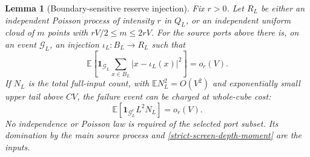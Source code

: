 \documentclass[11pt,reqno]{amsart}
\newtheorem{lemma}[theorem]{Lemma}
\theoremstyle{definition}
\theoremstyle{remark}
\numberwithin{equation}{section}
\newcommand{\E}{\mathbb E}
\begin{document}
\begin{lemma}[Boundary-sensitive reserve injection]
\label{strict-screen-injection}
Fix \(r>0\). Let \(R_L\) be either an independent Poisson process of
intensity \(r\) in \(Q_L\), or an independent uniform cloud of \(m\)
points with \(rV/2\le m\le2rV\). For the source ports above there is,
on an event \(\mathcal G_L\), an injection \(\iota_L:B_L\to R_L\)
such that
\begin{equation}
\label{strict-screen-injection-cost}
 \E\!\left[\mathbf1_{\mathcal G_L}
        \sum_{x\in B_L}|x-\iota_L(x)|^2\right]=o_r(V).
\end{equation}
If \(N_L\) is the total full-input count, with
\(\E N_L^2=O(V^2)\) and exponentially small upper tail above \(CV\),
the failure event can be charged at whole-cube cost:
\begin{equation}
\label{strict-screen-injection-exception}
 \E\!\left[\mathbf1_{\mathcal G_L^c}L^2N_L\right]=o_r(V).
\end{equation}
No independence or Poisson law is required of the selected port subset.
Its domination by the main source process and
\eqref{strict-screen-depth-moment} are the inputs.
\end{lemma}
\end{document}
